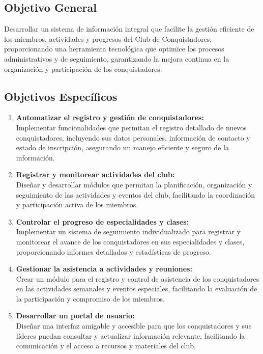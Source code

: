 \documentclass[stu, 12pt, letterpaper, donotrepeattitle, floatsintext, natbib]{apa7}
\begin{document}
\subsection{Objetivo General}
Desarrollar un sistema de informaci\'on integral que facilite la gesti\'on
eficiente de los miembros, actividades y progresos del Club de Conquistadores,
proporcionando una herramienta tecnol\'ogica que optimice los procesos
administrativos y de seguimiento, garantizando la mejora continua en la
organizaci\'on y participaci\'on de los conquistadores.

\subsection{Objetivos Espec\'ificos}
\begin{enumerate}
    \item\textbf{Automatizar el registro y gesti\'on de conquistadores:}\\Implementar funcionalidades que permitan el registro detallado de nuevos conquistadores, incluyendo sus datos personales, informaci\'on de contacto y estado de inscripci\'on, asegurando un manejo eficiente y seguro de la informaci\'on.
    \item\textbf{Registrar y monitorear actividades del club:}\\Diseñar y desarrollar m\'odulos que permitan la planificaci\'on, organizaci\'on y seguimiento de las actividades y eventos del club, facilitando la coordinaci\'on y participaci\'on activa de los miembros.
    \item\textbf{Controlar el progreso de especialidades y clases:}\\Implementar un sistema de seguimiento individualizado para registrar y monitorear el avance de los conquistadores en sus especialidades y clases, proporcionando informes detallados y estad\'isticas de progreso.
    \item\textbf{Gestionar la asistencia a actividades y reuniones:}\\Crear un m\'odulo para el registro y control de asistencia de los conquistadores en las actividades semanales y eventos especiales, facilitando la evaluaci\'on de la participaci\'on y compromiso de los miembros.
    \item\textbf{Desarrollar un portal de usuario:}\\Dise\~{n}ar una interfaz amigable y accesible para que los conquistadores y sus l\'ideres puedan consultar y actualizar informaci\'on relevante, facilitando la comunicaci\'on y el acceso a recursos y materiales del club.

\end{enumerate}
\end{document}
